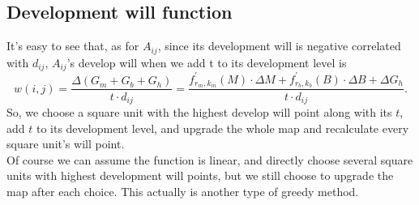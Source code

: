 \subsection{Development will function}
It's easy to see that, as for $ A_{ij} $, since its development will is negative correlated with $ d_{ij} $, $ A_{ij} $'s develop will when we add t to its development level is $$ w(i,j)=\frac{\Delta (G_m+G_b+G_h)}{t\cdot d_{ij}}=\frac{f_{r_m, k_m}^{'} (M) \cdot \Delta M + f_{r_b, k_b}^{'} (B) \cdot \Delta B + \Delta G_h}{t \cdot d_{ij}}. $$ So, we choose a square unit with the highest develop will point along with its $t$, add $t$ to its development level, and upgrade the whole map and recalculate every square unit's will point.\\

Of course we can assume the function is linear, and directly choose several square units with highest development will points, but we still choose to upgrade the map after each choice.
This actually is another type of greedy method.\\

